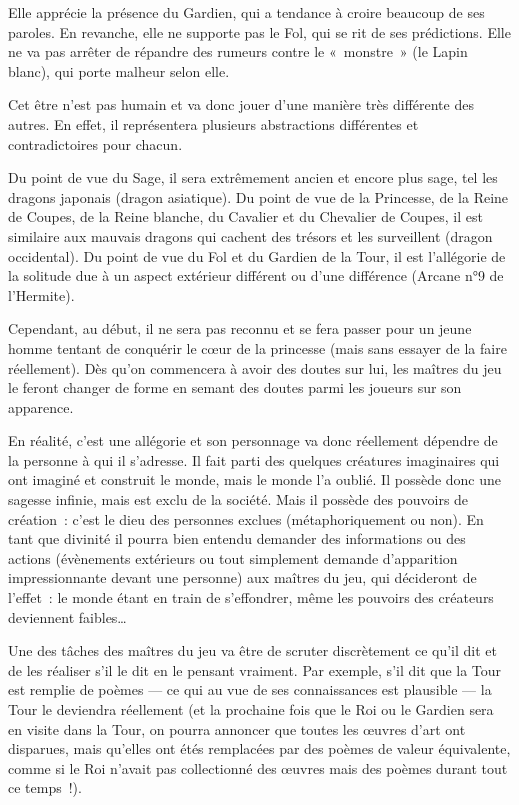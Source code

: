 {{Elle apprécie la présence du Gardien, qui a tendance à croire beaucoup de ses paroles.
En revanche, elle ne supporte pas le Fol, qui se rit de ses prédictions.
Elle ne va pas arrêter de répandre des rumeurs contre le «~monstre~» (le Lapin blanc), qui porte malheur selon elle.
}

{
Cet être n’est pas humain et va donc jouer d’une manière très différente des autres.
En effet, il représentera plusieurs abstractions différentes et contradictoires pour chacun.

Du point de vue du Sage, il sera extrêmement ancien et encore plus sage, tel les dragons japonais (dragon asiatique).
Du point de vue de la Princesse, de la Reine de Coupes, de la Reine blanche, du Cavalier et du Chevalier de Coupes, il est similaire aux mauvais dragons qui cachent des trésors et les surveillent (dragon occidental).
Du point de vue du Fol et du Gardien de la Tour, il est l’allégorie de la solitude due à un aspect extérieur différent ou d’une différence (Arcane n°9 de l’Hermite).

Cependant, au début, il ne sera pas reconnu et se fera passer pour un jeune homme tentant de conquérir le cœur de la princesse (mais sans essayer de la faire réellement).
Dès qu’on commencera à avoir des doutes sur lui, les maîtres du jeu le feront changer de forme en semant des doutes parmi les joueurs sur son apparence.

En réalité, c’est une allégorie et son personnage va donc réellement dépendre de la personne à qui il s’adresse.
Il fait parti des quelques créatures imaginaires qui ont imaginé et construit le monde, mais le monde l’a oublié.
Il possède donc une sagesse infinie, mais est exclu de la société.
Mais il possède des pouvoirs de création~:  c’est le dieu des personnes exclues (métaphoriquement ou non).
En tant que divinité il pourra bien entendu demander des informations ou des actions (évènements extérieurs ou tout simplement demande d’apparition impressionnante devant une personne) aux maîtres du jeu, qui décideront de l’effet~:  le monde étant en train de s’effondrer, même les pouvoirs des créateurs deviennent faibles…

Une des tâches des maîtres du jeu va être de scruter discrètement ce qu’il dit et de les réaliser s’il le dit en le pensant vraiment.
Par exemple, s’il dit que la Tour est remplie de poèmes — ce qui au vue de ses connaissances est plausible — la Tour le deviendra réellement (et la prochaine fois que le Roi ou le Gardien sera en visite dans la Tour, on pourra annoncer que toutes les œuvres d’art ont disparues, mais qu’elles ont étés remplacées par des poèmes de valeur équivalente, comme si le Roi n’avait pas collectionné des œuvres mais des poèmes durant tout ce temps~!).
}

}
